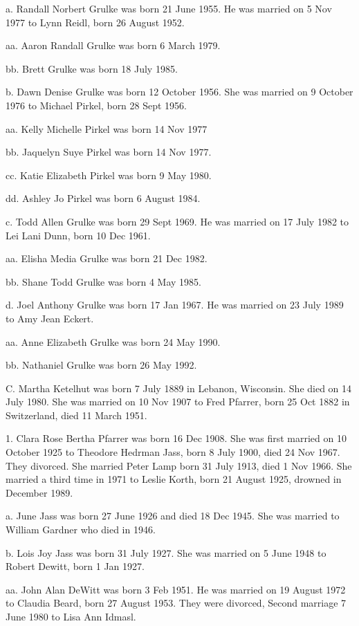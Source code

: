 \documentclass[a4paper]{article}
\begin{document}
a. Randall Norbert Grulke was born 21 June 1955.  He was married on 5 Nov 1977 to Lynn Reidl, born 26 August 1952. 

aa. Aaron Randall Grulke was born 6 March 1979.

bb. Brett Grulke was born 18 July 1985.

b. Dawn Denise Grulke was born 12 October 1956.  She was married on 9 October 1976 to Michael Pirkel, born 28 Sept 1956.

aa. Kelly Michelle Pirkel was born 14 Nov 1977

bb. Jaquelyn Suye Pirkel was born 14 Nov 1977.
				
cc.  Katie Elizabeth Pirkel was born 9 May 1980.

dd. Ashley Jo Pirkel was born 6 August 1984.

c. Todd Allen Grulke was born 29 Sept 1969.  He was married on 17 July 1982 to Lei Lani Dunn, born 10 Dec 1961.

aa. Elisha Media Grulke was born 21 Dec 1982.

bb. Shane Todd Grulke was born 4 May 1985.

d. Joel Anthony Grulke was born 17 Jan 1967.  He was married on 23 July 1989 to Amy Jean Eckert.

aa. Anne Elizabeth Grulke was born 24 May 1990.

bb. Nathaniel Grulke was born 26 May 1992.

C. Martha Ketelhut was born 7 July 1889 in Lebanon, Wisconsin.  She died on 14 July 1980.  She was married on 10 Nov 1907 to Fred Pfarrer, born 25 Oct 1882 in Switzerland, died 11 March 1951. 

1. Clara Rose Bertha Pfarrer was born 16 Dec 1908.  She was first married on 10 October 1925 to Theodore Hedrman Jass, born 8 July 1900, died 24 Nov 1967.  They divorced.  She married Peter Lamp born 31 July 1913, died 1 Nov 1966.  She married a third time in 1971 to Leslie Korth, born 21 August 1925, drowned  in December 1989.  

a. June Jass was born 27 June 1926 and died 18 Dec 1945.  She was married to William Gardner who died in 1946.

b. Lois Joy Jass was born 31 July 1927.  She was married on 5 June 1948 to Robert Dewitt, born 1 Jan 1927.

aa. John Alan DeWitt was born 3 Feb 1951.  He was married on 19 August 1972 to Claudia Beard, born 27 August 1953.  They were divorced, Second marriage 7 June 1980 to Lisa Ann Idmasl.
\end{document}

